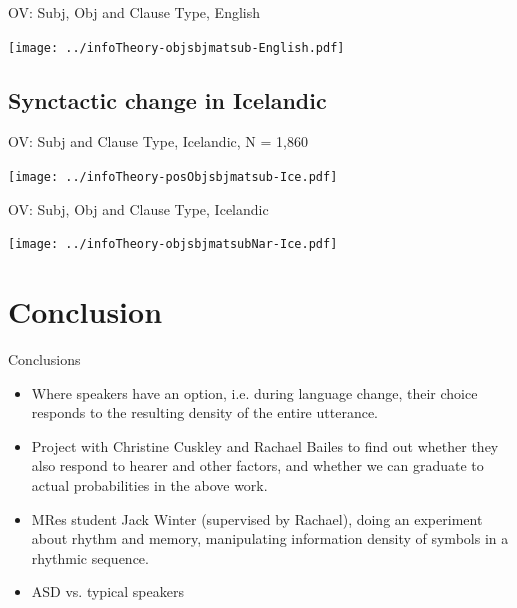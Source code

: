 \documentclass[hyperref={pdfpagelabels=false}]{beamer}
\begin{document}
\begin{frame}{OV: Subj, Obj and Clause Type, English} 



\texttt{[image: ../infoTheory-objsbjmatsub-English.pdf]}

\end{frame}

\subsection{Synctactic change in Icelandic}
\begin{frame}{OV: Subj and Clause Type, Icelandic, N = 1,860} 



\texttt{[image: ../infoTheory-posObjsbjmatsub-Ice.pdf]}

\end{frame}

\begin{frame}{OV: Subj, Obj and Clause Type, Icelandic}

\nocite{icepahc09}
	
	\texttt{[image: ../infoTheory-objsbjmatsubNar-Ice.pdf]}
	

\end{frame}






\section{Conclusion}

\begin{frame}{Conclusions}
		\begin{itemize}
			\item Where speakers have an option, i.e. during language change, their choice responds to the resulting density of the entire utterance.
			\item Project with Christine Cuskley and Rachael Bailes to find out whether they also respond to hearer and other factors, and whether we can graduate to actual probabilities in the above work.
			\item MRes student Jack Winter (supervised by Rachael), doing an experiment about rhythm and memory, manipulating information density of symbols in a rhythmic sequence.
			\item ASD vs. typical speakers 
		\end{itemize}
\end{frame}
\end{document}
